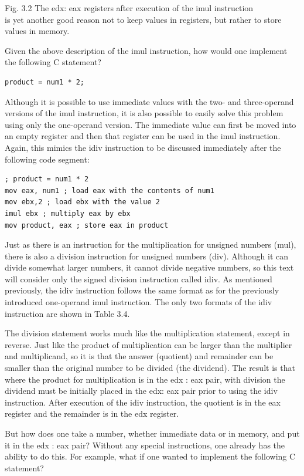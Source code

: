 \documentclass[10pt]{article}
\begin{document}
Fig. 3.2 The edx: eax registers after execution of the imul instruction\\
is yet another good reason not to keep values in registers, but rather to store values in memory.

Given the above description of the imul instruction, how would one implement the following C statement?

\begin{verbatim}
product = num1 * 2;
\end{verbatim}

Although it is possible to use immediate values with the two- and three-operand versions of the imul instruction, it is also possible to easily solve this problem using only the one-operand version. The immediate value can first be moved into an empty register and then that register can be used in the imul instruction. Again, this mimics the idiv instruction to be discussed immediately after the following code segment:

\begin{verbatim}
; product = num1 * 2
mov eax, num1 ; load eax with the contents of num1
mov ebx,2 ; load ebx with the value 2
imul ebx ; multiply eax by ebx
mov product, eax ; store eax in product
\end{verbatim}

Just as there is an instruction for the multiplication for unsigned numbers (mul), there is also a division instruction for unsigned numbers (div). Although it can divide somewhat larger numbers, it cannot divide negative numbers, so this text will consider only the signed division instruction called idiv. As mentioned previously, the idiv instruction follows the same format as for the previously introduced one-operand imul instruction. The only two formats of the idiv instruction are shown in Table 3.4.

The division statement works much like the multiplication statement, except in reverse. Just like the product of multiplication can be larger than the multiplier and multiplicand, so it is that the answer (quotient) and remainder can be smaller than the original number to be divided (the dividend). The result is that where the product for multiplication is in the edx : eax pair, with division the dividend must be initially placed in the edx: eax pair prior to using the idiv instruction. After execution of the idiv instruction, the quotient is in the eax register and the remainder is in the edx register.

But how does one take a number, whether immediate data or in memory, and put it in the edx : eax pair? Without any special instructions, one already has the ability to do this. For example, what if one wanted to implement the following C statement?
\end{document}

